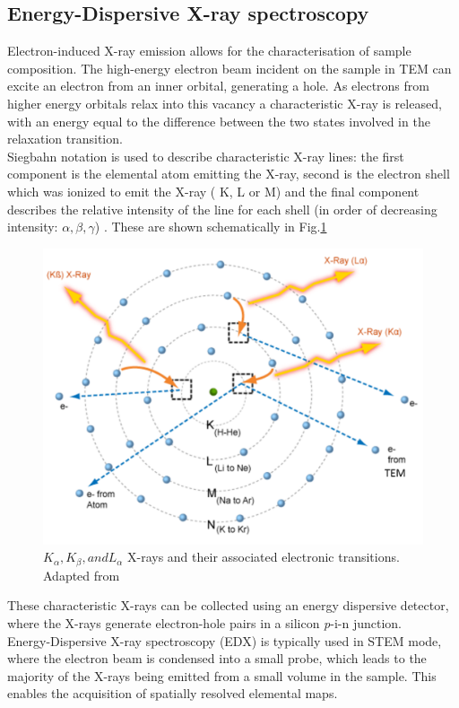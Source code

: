 \subsection{Energy-Dispersive X-ray spectroscopy}
Electron-induced X-ray emission allows for the characterisation of sample composition. The high-energy electron beam incident on the sample in TEM can excite an electron from an inner orbital, generating a hole. As electrons from higher energy orbitals relax into this vacancy a characteristic X-ray is released, with an energy equal to the difference between the two states involved in the relaxation transition.\\
Siegbahn notation is used to describe characteristic X-ray lines: the first component is the elemental atom emitting the X-ray, second is the electron shell which was ionized to emit the X-ray ( K, L or M) and the final component describes the relative intensity of the line for each shell (in order of decreasing intensity: $\alpha, \beta, \gamma$) \cite{Facility}. These are shown schematically in Fig.\ref{xray}

\begin{figure}[!ht]
	\centering
	\includegraphics[width=1\textwidth]{Figs/Ch2/xray}
	\caption[h] {$K_{\alpha}, K_{\beta}, and L_{\alpha}$ X-rays and their associated electronic transitions. Adapted from \cite{Facility}}
	\label{xray}
\end{figure}
\FloatBarrier

These characteristic X-rays can be collected using an energy dispersive detector, where the X-rays generate electron-hole pairs in a silicon {\textit p-i-n} junction.\\
Energy-Dispersive X-ray spectroscopy (EDX) is typically used in STEM mode, where the electron beam is condensed into a small probe, which leads to the majority of the X-rays being emitted from a small volume in the sample. This enables the acquisition of spatially resolved elemental maps.

